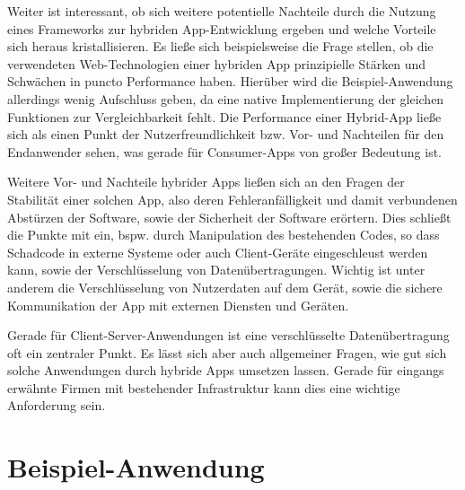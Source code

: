  	Weiter ist interessant, ob sich weitere potentielle Nachteile durch die Nutzung eines Frameworks zur hybriden App-Entwicklung ergeben und welche Vorteile sich heraus kristallisieren. 
 	Es ließe sich beispielsweise die Frage stellen, ob die verwendeten Web-Technologien einer hybriden App prinzipielle Stärken und Schwächen in puncto Performance haben. 
 	Hierüber wird die Beispiel-Anwendung allerdings wenig Aufschluss geben, da eine native Implementierung der gleichen Funktionen zur Vergleichbarkeit fehlt. Die Performance einer Hybrid-App ließe sich als einen Punkt der Nutzerfreundlichkeit bzw. Vor- und Nachteilen für den Endanwender sehen, was gerade für Consumer-Apps von großer Bedeutung ist.
 	
 	Weitere Vor- und Nachteile hybrider Apps ließen sich an den Fragen der Stabilität einer solchen App, also deren Fehleranfälligkeit und damit verbundenen Abstürzen der Software, sowie der Sicherheit der Software erörtern. Dies schließt die Punkte mit ein, bspw. durch Manipulation des bestehenden Codes, so dass Schadcode in externe Systeme oder auch Client-Geräte eingeschleust werden kann, sowie der Verschlüsselung von Datenübertragungen. 
 	Wichtig ist unter anderem die Verschlüsselung von Nutzerdaten auf dem Gerät, sowie die sichere Kommunikation der App mit externen Diensten und Geräten.
 	
 	Gerade für Client-Server-Anwendungen ist eine verschlüsselte Datenübertragung oft ein zentraler Punkt. Es lässt sich aber auch allgemeiner Fragen, wie gut sich solche Anwendungen durch hybride Apps umsetzen lassen. Gerade für eingangs erwähnte Firmen mit bestehender Infrastruktur kann dies eine wichtige Anforderung sein.
 	

\section{Beispiel-Anwendung}	\label{sec:bsp-app} 



